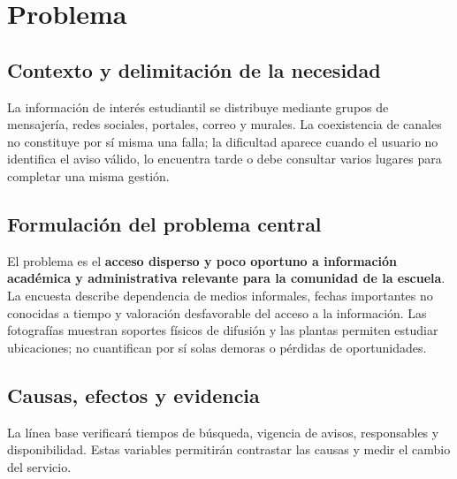 \section{Problema}
\subsection{Contexto y delimitación de la necesidad}
La información de interés estudiantil se distribuye mediante grupos de mensajería, redes sociales, portales, correo y murales. La coexistencia de canales no constituye por sí misma una falla; la dificultad aparece cuando el usuario no identifica el aviso válido, lo encuentra tarde o debe consultar varios lugares para completar una misma gestión.

\subsection{Formulación del problema central}
El problema es el \textbf{acceso disperso y poco oportuno a información académica y administrativa relevante para la comunidad de la escuela}. La encuesta describe dependencia de medios informales, fechas importantes no conocidas a tiempo y valoración desfavorable del acceso a la información. Las fotografías muestran soportes físicos de difusión y las plantas permiten estudiar ubicaciones; no cuantifican por sí solas demoras o pérdidas de oportunidades.

\subsection{Causas, efectos y evidencia}
La línea base verificará tiempos de búsqueda, vigencia de avisos, responsables y disponibilidad. Estas variables permitirán contrastar las causas y medir el cambio del servicio.

